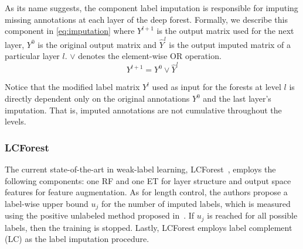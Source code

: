 \documentclass[conference,compsoc]{IEEEtran}
\begin{document}
As its name suggests, the component label imputation is responsible for imputing missing annotations at each layer of the deep forest. Formally, we describe this component in \autoref{eq:imputation} where $Y^{l+1}$ is the output matrix used for the next layer, $Y^0$ is the original output matrix and $\hat Y^l$ is the output imputed matrix of a particular layer $l$. $\vee$ denotes the element-wise OR operation.
%
%
%
\begin{equation}
    Y^{l+1} = Y^0 \vee \hat Y^l
    \label{eq:imputation}
\end{equation}
%
%

Notice that the modified label matrix $Y^l$ used as input for the forests at level $l$ is directly dependent only on the original annotations $Y^0$ and the last layer's imputation. That is, imputed annotations are not cumulative throughout the levels. %


\subsubsection{LCForest}
\label{sec:lc}

The current state-of-the-art in weak-label learning, LCForest~\cite{wang2020learning}, employs the following components: one RF and one ET for layer structure and output space features for feature augmentation.
As for length control, the authors propose a label-wise upper bound $u_j$ for the number of imputed labels, which is measured using the positive unlabeled method proposed in~\cite{bekker2018estimating}. If $u_j$ is reached for all possible labels, then the training is stopped. Lastly, LCForest employs label complement (LC) as the label imputation procedure. 
\end{document}
